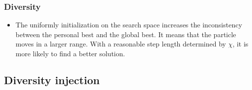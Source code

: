 \subsubsection{Diversity}

\begin{itemize}
\item The uniformly initialization on the search space increases the inconsistency between the personal best and the global best.
It means that the particle moves in a larger range.
With a reasonable step length determined by $ \chi $, it is more likely to find a better solution.
\end{itemize}

\subsection{Diversity injection}

